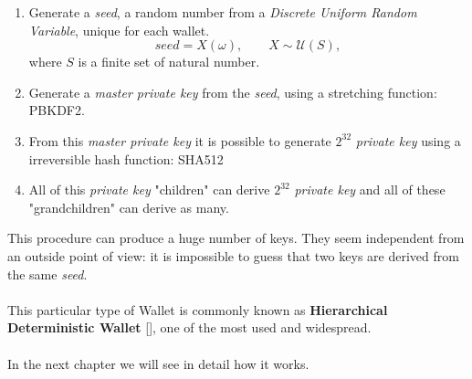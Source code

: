 \begin{enumerate}[label=(\roman*)]
	\item Generate a \textit{seed}, a random number from a \textit{Discrete Uniform Random Variable}, unique for each wallet.
	\begin{equation*}
	seed=X(\omega), \qquad X\sim \mathcal{U}(S),
	\end{equation*}
	where $S$ is a finite set of natural number.
	\item Generate a \textit{master private key} from the \textit{seed}, using a stretching function: PBKDF2.
	\item From this \textit{master private key} it is possible to generate $2^{32}$ \textit{private key} using a irreversible hash function: SHA512
	\item All of this \textit{private key} "children" can derive $2^{32}$ \textit{private key} and all of these "grandchildren" can derive as many.
\end{enumerate}
This procedure can produce a huge number of keys. They seem independent from an outside point of view: it is impossible to guess that two keys are derived from the same \textit{seed}.
\\ \\ 
This particular type of Wallet is commonly known as \textbf{Hierarchical Deterministic Wallet} [\cite{1}], one of the most used and widespread.
\\ \\
In the next chapter we will see in detail how it works.
